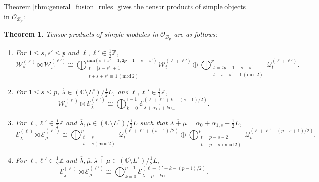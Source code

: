 \documentclass[11pt, reqno]{amsart}
\newtheorem{thm}{Theorem}[section]
\theoremstyle{definition}\newtheorem{defi}[thm]{Definition}
\theoremstyle{definition}\newtheorem{rem}[thm]{Remark}
\theoremstyle{definition}\newtheorem{exam}[thm]{Example}
\theoremstyle{definition}\newtheorem{assum}[thm]{Assumption}
\newcommand{\cB}{\mathcal{B}}
\newcommand{\cE}{\mathcal{E}}
\newcommand{\cO}{\mathcal{O}}
\newcommand{\cW}{\mathcal{W}}
\newcommand{\CC}{\mathbb{C}}
\newcommand{\ZZ}{\mathbb{Z}}
\newcommand{\tens}{\boxtimes}
\begin{document}
 

 
 
 Theorem \ref{thm:general_fusion_rules} gives the tensor products of simple objects in $\cO_{\cB_p}$:
  \begin{thm}\label{thm:Bp_tensor_products}
 Tensor products of simple modules in $\cO_{\mathcal{B}_p}$ are as follows:
 \begin{enumerate}
 
\item For $1\leq s,s'\leq p$ and $\ell,\ell'\in\frac{1}{2}\ZZ$, 
\begin{equation*}
  \cW_{s}^{(\ell)}\tens \cW_{s'}^{(\ell')}\cong\bigoplus_{\substack{t=\vert s-s'\vert+1\\ t+s+s'\equiv 1\,(\mathrm{mod}\,2)}}^{\mathrm{min}(s+s'-1, 2p-1-s-s')} \cW_{t}^{(\ell+\ell')}\oplus\bigoplus_{\substack{t=2p+1-s-s'\\ t+s+s'\equiv 1\,(\mathrm{mod}\,2)}}^p \mathcal{Q}_{t}^{(\ell+\ell')}.
 \end{equation*}
 
 \item For $1\leq s\leq p$, $\overline{\lambda}\in(\CC\setminus L^\circ)\big/\frac{1}{2}L$, and $\ell,\ell'\in\frac{1}{2}\ZZ$,
 \begin{equation*}
 \cW_s^{(\ell)}\tens\cE_{\overline{\lambda}}^{(\ell')} \cong\bigoplus_{k=0}^{s-1} \cE_{\overline{\lambda+\alpha_{1,s}+k\alpha_-}}^{(\ell+\ell'+k-(s-1)/2)}.
\end{equation*}
 
 \item For $\ell,\ell'\in\frac{1}{2}\ZZ$ and $\overline{\lambda},\overline{\mu}\in(\CC\setminus L^\circ)\big/\frac{1}{2}L$ such that $\overline{\lambda+\mu}=\alpha_0+\alpha_{1,s}+\frac{1}{2}L$,
 \begin{equation*}
\cE_{\overline{\lambda}}^{(\ell)}\tens\cE_{\overline{\mu}}^{(\ell')}\cong\bigoplus_{\substack{t=s\\ t\equiv s\,(\mathrm{mod}\,2)}}^p \mathcal{Q}_{t}^{(\ell+\ell'+(s-1)/2)} \oplus \bigoplus_{\substack{t=p-s+2\\ t\equiv p-s\,(\mathrm{mod}\,2)}}^p \mathcal{Q}_{t}^{(\ell+\ell'-(p-s+1)/2)}.
\end{equation*}
 
 
\item For $\ell,\ell'\in\frac{1}{2}\ZZ$ and $\overline{\lambda},\overline{\mu},\overline{\lambda+\mu}\in(\CC\setminus L^\circ)\big/ \frac{1}{2}L$,
\begin{equation*}
 \cE_{\overline{\lambda}}^{(\ell)}\tens\cE_{\overline{\mu}}^{(\ell')}\cong\bigoplus_{k=0}^{p-1} \cE_{\overline{\lambda+\mu+k\alpha_-}}^{(\ell+\ell'+k-(p-1)/2)} .
 \end{equation*}
 
 \end{enumerate}

\end{thm}
\end{document}
